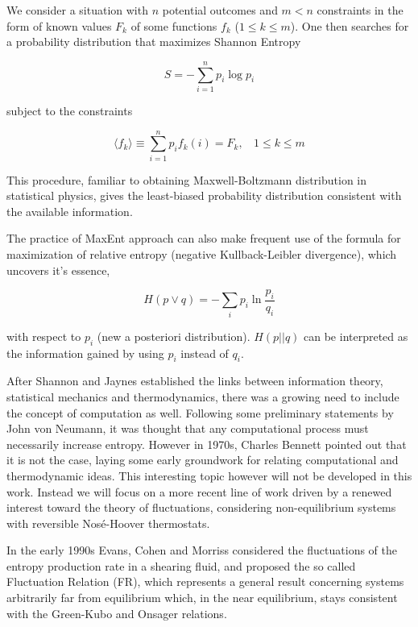 \documentclass[a4paper,12pt]{article}
\begin{document}
We consider a situation with $n$ potential outcomes and $m<n$ constraints in the form of known values $F_k$ of some functions $f_k$ ($1 \leq k \leq m$).
One then searches for a probability distribution that maximizes Shannon Entropy

\begin{equation}
  S=-\sum_{i=1}^n p_i \log p_i
\end{equation}

subject to the constraints

\begin{equation}
  \langle f_k \rangle \equiv \sum_{i=1}^n p_i f_k(i)=F_k,\ \ \ \  1\leq k \leq m
\end{equation}

This procedure, familiar to obtaining Maxwell-Boltzmann distribution in statistical physics, gives the least-biased probability distribution consistent with the available information.

The practice of MaxEnt approach can also make frequent use of the formula for maximization of relative entropy (negative Kullback-Leibler divergence), which uncovers it's essence,

\begin{equation}
\label{Kullback-Leibler}
    H(p\lor q) = -\sum_i p_i \ln \frac{p_i}{q_i}
\end{equation}


with respect to $p_i$ (new a posteriori distribution). $H(p||q)$ can be interpreted as the information gained by using $p_i$ instead of $q_i$.


After Shannon and Jaynes established the links between information theory, statistical mechanics and thermodynamics, there was a growing need to include the concept of computation as well. Following some preliminary statements by John von Neumann, it was thought that any computational process must necessarily increase entropy.
However in 1970s, Charles Bennett pointed out that it is not the case\cite{Bennett:1973ko}, laying some early groundwork for relating computational and thermodynamic ideas. This interesting topic however will not be developed in this work. Instead we will focus on a more recent line of work driven by a renewed interest toward the theory of fluctuations, considering non-equilibrium systems with reversible Nosé-Hoover thermostats.

In the early 1990s Evans, Cohen and Morriss considered the fluctuations of the entropy production rate in a shearing fluid, and proposed the so called Fluctuation Relation (FR), which represents a general result concerning systems arbitrarily far from equilibrium which, in the near equilibrium,  stays consistent with the Green-Kubo and Onsager relations. 
\end{document}
